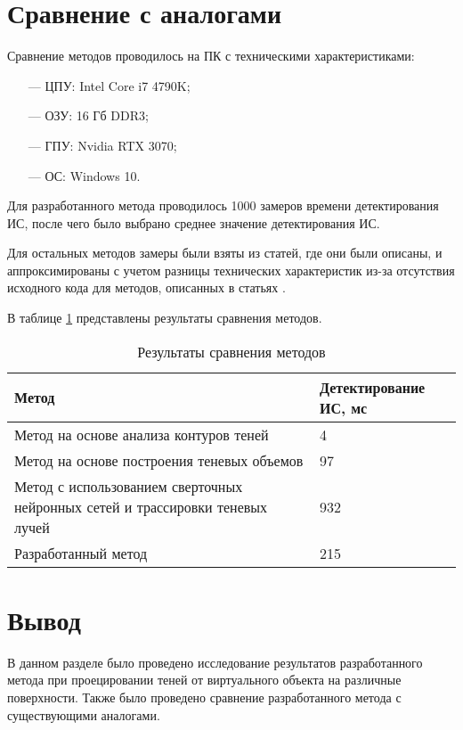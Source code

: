 \section{Сравнение с аналогами}

Сравнение методов проводилось на ПК с техническими характеристиками:

\begin{itemize}
	\item[---] ЦПУ: Intel Core i7 4790K;
	\item[---] ОЗУ: 16 Гб DDR3;
	\item[---] ГПУ: Nvidia RTX 3070;
	\item[---] ОС: Windows 10.
\end{itemize}

Для разработанного метода проводилось 1000 замеров времени детектирования ИС, после чего было выбрано среднее значение детектирования ИС.

Для остальных методов замеры были взяты из статей, где они были описаны, и аппроксимированы с учетом разницы технических характеристик из-за отсутствия исходного кода для методов, описанных в статьях \cite{shadow_contours_method} \cite{THOMASIAN2022385} \cite{sns_tras}.

В таблице \ref{CompareMethods} представлены результаты сравнения методов.

\begin{table}[H]
	\caption{Результаты сравнения методов}
	\label{CompareMethods}
	\begin{center}
		\begin{tabular}{| p{8 cm} | p{3.5 cm} |} 
			\hline
			Метод & Детектирование ИС, мс \\
			\hline
			Метод на основе анализа контуров теней & 4 \\
			\hline
			Метод на основе построения теневых объемов & 97 \\
			\hline
			Метод с использованием сверточных нейронных сетей и трассировки теневых лучей & 932 \\
			\hline
			Разработанный метод & 215 \\
			\hline
		\end{tabular}
	\end{center}
\end{table}

\section{Вывод}

В данном разделе было проведено исследование результатов разработанного метода при проецировании теней от виртуального объекта на различные поверхности. Также было проведено сравнение разработанного метода с существующими аналогами.

